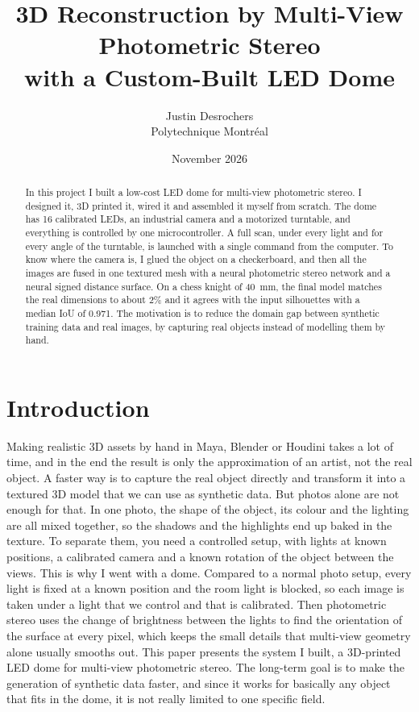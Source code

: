 \documentclass[10pt,twocolumn]{article}
\title{3D Reconstruction by Multi-View Photometric Stereo\\with a Custom-Built LED Dome}
\author{Justin Desrochers\\Polytechnique Montr\'eal}
\date{November 2026}
\begin{document}
\maketitle

\begin{abstract}
In this project I built a low-cost LED dome for multi-view photometric stereo. I designed it, 3D printed it, wired it and assembled it myself from scratch. The dome has 16 calibrated LEDs, an industrial camera and a motorized turntable, and everything is controlled by one microcontroller. A full scan, under every light and for every angle of the turntable, is launched with a single command from the computer. To know where the camera is, I glued the object on a checkerboard, and then all the images are fused in one textured mesh with a neural photometric stereo network and a neural signed distance surface. On a chess knight of 40~mm, the final model matches the real dimensions to about 2\% and it agrees with the input silhouettes with a median IoU of 0.971. The motivation is to reduce the domain gap between synthetic training data and real images, by capturing real objects instead of modelling them by hand.
\end{abstract}

\section{Introduction}
Making realistic 3D assets by hand in Maya, Blender or Houdini takes a lot of time, and in the end the result is only the approximation of an artist, not the real object. A faster way is to capture the real object directly and transform it into a textured 3D model that we can use as synthetic data. But photos alone are not enough for that. In one photo, the shape of the object, its colour and the lighting are all mixed together, so the shadows and the highlights end up baked in the texture. To separate them, you need a controlled setup, with lights at known positions, a calibrated camera and a known rotation of the object between the views. This is why I went with a dome. Compared to a normal photo setup, every light is fixed at a known position and the room light is blocked, so each image is taken under a light that we control and that is calibrated. Then photometric stereo uses the change of brightness between the lights to find the orientation of the surface at every pixel, which keeps the small details that multi-view geometry alone usually smooths out. This paper presents the system I built, a 3D-printed LED dome for multi-view photometric stereo. The long-term goal is to make the generation of synthetic data faster, and since it works for basically any object that fits in the dome, it is not really limited to one specific field.
\end{document}
